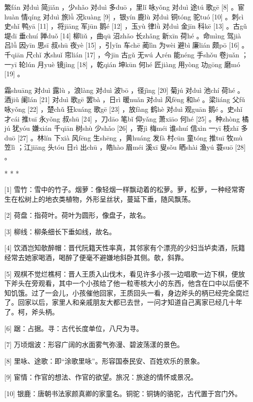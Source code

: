 \documentclass[12pt,UTF8]{ctexbook}
\begin{document}
繁fán 对duì 简jiǎn ，少shǎo 对duì 多duō ，里lǐ 咏yǒng 对duì 途tú 歌gē [8] 。宦huàn 情qíng 对duì 旅lǚ 况kuàng [9] ，银yín 鹿lù 对duì 铜tóng 驼tuó [10] 。刺cì 史shǐ 鸭yā [11] ，将jiāng 军jūn 鹅é [12] ，玉yù 律lǜ 对duì 金jīn 科kē [13] 。古gǔ 堤dī 垂chuí 亸duǒ [14] 柳liǔ ，曲qū 沼zhǎo 长zhǎng 新xīn 荷hé 。命mìng 驾jià 吕lǚ 因yīn 思sī 叔shū 夜yè [15] ，引yǐn 车chē 蔺lìn 为wèi 避bì 廉lián 颇pō [16] 。千qiān 尺chǐ 水shuǐ 帘lián [17] ，今jīn 古gǔ 无wú 人rén 能néng 手shǒu 卷juǎn ；一yī 轮lún 月yuè 镜jìng [18] ，乾qián 坤kūn 何hé 匠jiàng 用yòng 功gōng 磨mó [19] 。

霜shuāng 对duì 露lù ，浪làng 对duì 波bō ，径jìng [20] 菊jú 对duì 池chí 荷hé 。酒jiǔ 阑lán [21] 对duì 歌gē 罢bà ，日rì 暖nuǎn 对duì 风fēng 和hé 。梁liáng 父fǔ 咏yǒng [22] ，楚chǔ 狂kuáng 歌gē [23] ，放fàng 鹤hè 对duì 观guān 鹅é 。史shǐ 才cái 推tuī 永yǒng 叔shū [24] ，刀dāo 笔bǐ 仰yǎng 萧xiāo 何hé [25] 。种zhòng 橘jú 犹yóu 嫌xián 千qiān 树shù 少shǎo [26] ，寄jì 梅méi 谁shuí 信xìn 一yī 枝zhī 多duō [27] 。林lín 下xià 风fēng 生shēng ，黄huáng 发fà 村cūn 童tóng 推tuī 牧mù 笠lì ；江jiāng 头tóu 日rì 出chū ，皓hào 眉méi 溪xī 叟sǒu 晒shài 渔yú 蓑suō [28] 。



* * *



[1] 雪竹：雪中的竹子。烟萝：像轻烟一样飘动着的松萝。萝，松萝，一种经常寄生在松树上的地衣类植物，外形呈丝状，蔓延下垂，随风飘荡。

[2] 荷盘：指荷叶。荷叶为圆形，像盘子，故名。

[3] 柳线：柳条细长下垂如线，故名。

[4] 饮酒岂知欹醉帽：晋代阮籍天性率真，其邻家有个漂亮的少妇当垆卖酒，阮籍经常去她家喝酒，喝醉了便毫不避嫌地斜卧其侧。欹，斜靠。

[5] 观棋不觉烂樵柯：晋人王质入山伐木，看见许多小孩一边唱歌一边下棋，便放下斧头在旁观看，其中一个小孩给了他一粒枣核大小的东西，他含在口中以后便不知饥饿。过了一会儿，小孩催他回家，王质回头一看，身边斧头的柄已经完全腐烂了。回家以后，家里人和亲戚朋友大都已去世，一问才知道自己离家已经几十年了。柯，斧头柄。

[6] 踞：占据。寻：古代长度单位，八尺为寻。

[7] 万顷烟波：形容广阔的水面雾气弥漫、碧波荡漾的景色。

[8] 里咏、途歌：即“涂歌里咏”。形容国泰民安、百姓欢乐的景象。

[9] 宦情：作官的想法、作官的欲望。旅况：旅途的情怀或景况。

[10] 银鹿：唐朝书法家颜真卿的家童名。铜驼：铜铸的骆驼，古代置于宫门外。
\end{document}

